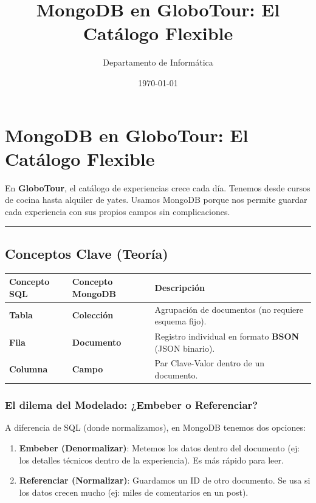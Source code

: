 \documentclass[12pt,a4paper]{article}
\title{\textbf{MongoDB en GloboTour: El Catálogo Flexible}}
\author{Departamento de Informática}
\date{\today}
\begin{document}
\maketitle

\section{MongoDB en GloboTour: El Catálogo Flexible}

En \textbf{GloboTour}, el catálogo de experiencias crece cada día.
Tenemos desde cursos de cocina hasta alquiler de yates. Usamos MongoDB
porque nos permite guardar cada experiencia con sus propios campos sin
complicaciones.

\begin{center}\rule{0.5\linewidth}{0.5pt}\end{center}

\subsection{Conceptos Clave (Teoría)}

\begin{longtable}[]{@{}
  >{\raggedright\arraybackslash}p{}
  >{\raggedright\arraybackslash}p{}
  >{\raggedright\arraybackslash}p{}@{}}
\toprule
Concepto SQL & Concepto MongoDB & Descripción \\
\midrule
\endhead
\textbf{Tabla} & \textbf{Colección} & Agrupación de documentos (no requiere esquema fijo). \\
\textbf{Fila} & \textbf{Documento} & Registro individual en formato \textbf{BSON} (JSON binario). \\
\textbf{Columna} & \textbf{Campo} & Par Clave-Valor dentro de un documento. \\
\bottomrule
\end{longtable}

\subsubsection{El dilema del Modelado: ¿Embeber o Referenciar?}

A diferencia de SQL (donde normalizamos), en MongoDB tenemos dos opciones:
\begin{enumerate}
    \item \textbf{Embeber (Denormalizar)}: Metemos los datos dentro del documento (ej: los detalles técnicos dentro de la experiencia). Es más rápido para leer.
    \item \textbf{Referenciar (Normalizar)}: Guardamos un ID de otro documento. Se usa si los datos crecen mucho (ej: miles de comentarios en un post).
\end{enumerate}
\end{document}

